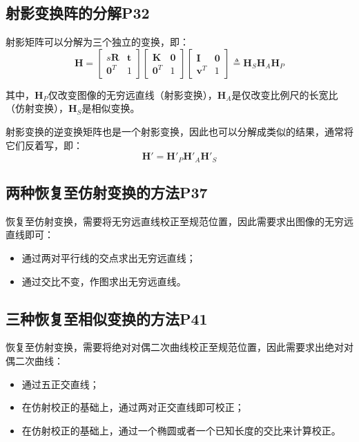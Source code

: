 \documentclass[11pt]{article}
\begin{document}
\subsection{	射影变换阵的分解P32}
射影矩阵可以分解为三个独立的变换，即：
\begin{equation*}
  \mathbf{H}=\begin{bmatrix}
    s\mathbf{R} & \mathbf{t} \\
    \mathbf{0}^T & 1
  \end{bmatrix}
  \begin{bmatrix}
    \mathbf{K} & \mathbf{0} \\
    \mathbf{0}^T & 1
  \end{bmatrix}
  \begin{bmatrix}
    \mathbf{I} & \mathbf{0} \\
    \mathbf{v}^T & 1
  \end{bmatrix}
  \triangleq\mathbf{H}_S\mathbf{H}_A\mathbf{H}_P
\end{equation*}\par
其中，$\mathbf{H}_P$仅改变图像的无穷远直线（射影变换），$\mathbf{H}_A$是仅改变比例尺的长宽比（仿射变换），$\mathbf{H}_S$是相似变换。\par
射影变换的逆变换矩阵也是一个射影变换，因此也可以分解成类似的结果，通常将它们反着写，即：
\begin{equation*}
  \mathbf{H}'=\mathbf{H}'_P\mathbf{H}'_A\mathbf{H}'_S
\end{equation*}\par
\subsection{	两种恢复至仿射变换的方法P37}
恢复至仿射变换，需要将无穷远直线校正至规范位置，因此需要求出图像的无穷远直线即可：
\begin{itemize}
  \item 通过两对平行线的交点求出无穷远直线；
  \item 通过交比不变，作图求出无穷远直线。
\end{itemize}
\subsection{三种恢复至相似变换的方法P41}
恢复至仿射变换，需要将绝对对偶二次曲线校正至规范位置，因此需要求出绝对对偶二次曲线：
\begin{itemize}
  \item 通过五正交直线；
  \item 在仿射校正的基础上，通过两对正交直线即可校正；
  \item 在仿射校正的基础上，通过一个椭圆或者一个已知长度的交比来计算校正。
\end{itemize}
\end{document}
